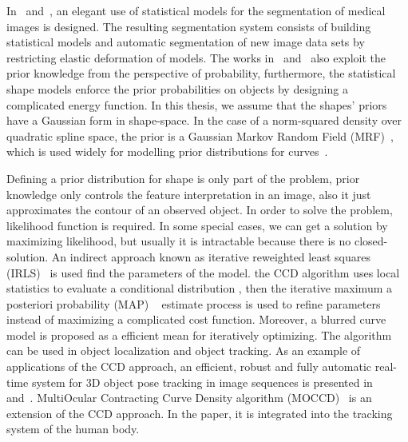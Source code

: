 In~\cite{kelemen1999three} and~\cite{kelemen1999elastic}, an elegant
use of statistical models for the segmentation of medical images is
designed.  The resulting segmentation system consists of building
statistical models and automatic segmentation of new image data
sets by restricting elastic deformation of models.  The works
in~\cite{sclaroff2001deformable} and~\cite{liu1999deformable} also
exploit the prior knowledge from the perspective of probability,
furthermore, the statistical shape models enforce the prior
probabilities on objects by designing a complicated energy function.  In this thesis, we assume that the shapes' priors have a Gaussian form in
shape-space. In the case of a norm-squared density over  quadratic spline space,
the prior is a Gaussian Markov Random Field
(MRF)~\cite{blake1998active}, which is used widely  for modelling
prior distributions for curves~\cite{storvik1994bayesian}.

Defining a prior distribution for shape is only part of the
problem, prior knowledge only controls the feature interpretation in an
image, also it just approximates the contour of an observed object. In
order to solve the problem, likelihood function is required. In some
special cases, we can get a solution by maximizing likelihood, but
usually it is intractable because there is no closed-solution. An indirect
approach known as iterative reweighted least squares
(IRLS)~\cite{bishop2006pattern} is used find the parameters of the model.
the CCD  algorithm uses local statistics to evaluate a conditional distribution
, then the iterative maximum a posteriori probability (MAP)
~\cite{sorenson1980parameter} estimate process is used to refine
parameters instead of maximizing a complicated cost function. 
Moreover, a blurred curve model is proposed as a efficient mean for iteratively optimizing. The algorithm
can be used in object localization and object tracking. As an example
of applications of the CCD approach, an efficient, robust and fully
automatic real-time system for 3D object pose tracking in
image sequences is presented in~\cite{panin2006fully}
and~\cite{panin2006efficient}. MultiOcular Contracting Curve Density
algorithm (MOCCD)~\cite{hahn2007tracking} is an extension of the CCD
approach. In the paper, it is integrated into the tracking system of
the human body. 

